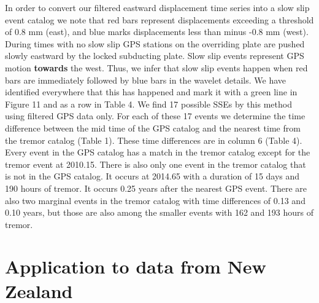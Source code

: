 \documentclass{article}
\begin{document}
In order to convert our filtered eastward displacement time series into a slow slip event catalog we note that red bars represent displacements exceeding a threshold of 0.8 mm (east), and blue marks displacements less than minus -0.8 mm (west).  During times with no slow slip GPS stations on the overriding plate are pushed slowly eastward by the locked subducting plate.  Slow slip events represent GPS motion \textbf{towards} the west.  Thus, we infer that slow slip events happen when red bars are immediately followed by blue bars in the wavelet details.  We have identified everywhere that this has happened and mark it with a green line in Figure 11 and as a row in Table 4.  We find 17 possible SSEs by this method using filtered GPS data only. For each of these 17 events we determine the time difference between the mid time of the GPS catalog and the nearest time from the tremor catalog (Table 1). These time differences are in column 6 (Table 4).  Every event in the GPS catalog has a match in the tremor catalog except for the tremor event at 2010.15. There is also only one event in the tremor catalog that is not in the GPS catalog. It occurs at 2014.65 with a duration of 15 days and 190 hours of tremor. It occurs 0.25 years after the nearest GPS event. There are also two marginal events in the tremor catalog with time differences of 0.13 and 0.10 years, but those are also among the smaller events with 162 and 193 hours of tremor.

\section{Application to data from New Zealand}
\end{document}
